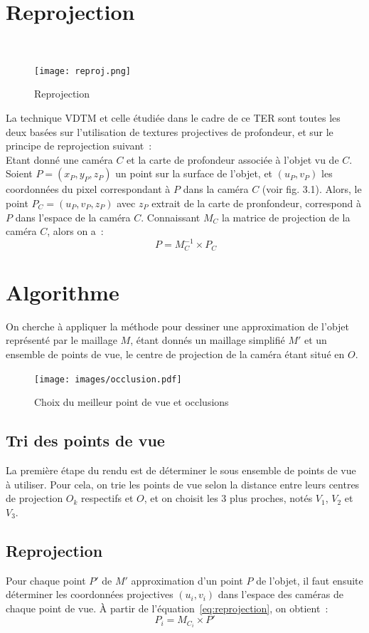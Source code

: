 \section{Reprojection}
\begin{figure}~\label{fig:reproj}
    \caption{Reprojection}
    \centering
    \texttt{[image: reproj.png]}
\end{figure}
La technique VDTM et celle étudiée dans le cadre de ce TER sont toutes les deux basées sur l'utilisation de textures
projectives de profondeur, et sur le principe de reprojection suivant~:\\
Etant donné une caméra $C$ et la carte de profondeur associée à l'objet vu de $C$.
Soient $P = (x_P, y_P, z_P)$ un point sur la surface de l'objet, et $(u_P, v_P)$ les coordonnées du pixel correspondant
à $P$ dans la caméra $C$ (voir fig. 3.1). Alors, le point $P_C = (u_P, v_P, z_P)$ avec $z_P$ extrait de la carte de pronfondeur, correspond à $P$
dans l'espace de la caméra $C$. Connaissant $M_C$ la matrice de projection de la caméra $C$, alors on a~:
\begin{equation}~\label{eq:reprojection}
    P = M_C^{-1}\times{}P_C
\end{equation}

\section{Algorithme}
On cherche à appliquer la méthode pour dessiner une approximation de l'objet représenté par le maillage $M$, étant donnés un maillage
simplifié $M'$ et un ensemble de points de vue, le centre de projection de la caméra étant situé en $O$.

\begin{figure}\label{fig:occlu}
    \centering
    \caption{Choix du meilleur point de vue et occlusions}
    \texttt{[image: images/occlusion.pdf]}
\end{figure}
\subsection{Tri des points de vue}\label{ssec:tri}
La première étape du rendu est de déterminer le sous ensemble de points de vue à utiliser. Pour cela, on trie les points de vue selon
la distance entre leurs centres de projection $O_k$ respectifs et $O$, et on choisit les 3 plus proches, notés $V_1$, $V_2$ et $V_3$.
\subsection{Reprojection}\label{ssec:proj}
Pour chaque point $P'$ de $M'$ approximation d'un point $P$ de l'objet, il faut ensuite déterminer les coordonnées projectives $(u_i, v_i)$ dans l'espace des caméras de chaque point
de vue. \`A partir de l'équation~\ref{eq:reprojection}, on obtient~:
\begin{equation}
    P_i=M_{C_i}\times{}P'
\end{equation}\label{ssec:choix}
